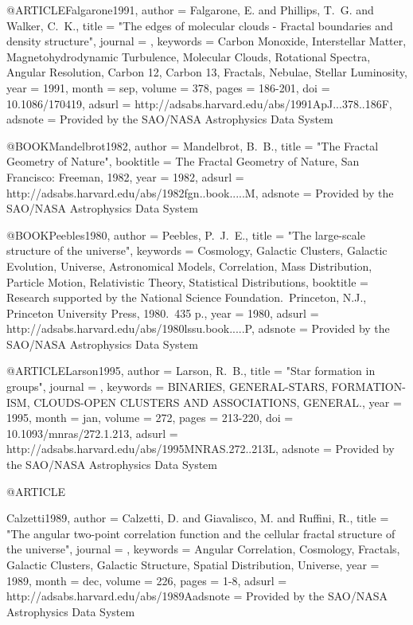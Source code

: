 \documentclass[useAMS,usenatbib]{mnras}
\begin{document}
{{{{{{{{{{{{{{{@ARTICLE{Falgarone1991,
   author = {{Falgarone}, E. and {Phillips}, T.~G. and {Walker}, C.~K.},
    title = "{The edges of molecular clouds - Fractal boundaries and density structure}",
  journal = {\apj},
 keywords = {Carbon Monoxide, Interstellar Matter, Magnetohydrodynamic Turbulence, Molecular Clouds, Rotational Spectra, Angular Resolution, Carbon 12, Carbon 13, Fractals, Nebulae, Stellar Luminosity},
     year = 1991,
    month = sep,
   volume = 378,
    pages = {186-201},
      doi = {10.1086/170419},
   adsurl = {http://adsabs.harvard.edu/abs/1991ApJ...378..186F},
  adsnote = {Provided by the SAO/NASA Astrophysics Data System}
}

@BOOK{Mandelbrot1982,
   author = {{Mandelbrot}, B.~B.},
    title = "{The Fractal Geometry of Nature}",
booktitle = {The Fractal Geometry of Nature, San Francisco: Freeman, 1982},
     year = 1982,
   adsurl = {http://adsabs.harvard.edu/abs/1982fgn..book.....M},
  adsnote = {Provided by the SAO/NASA Astrophysics Data System}
}

@BOOK{Peebles1980,
   author = {{Peebles}, P.~J.~E.},
    title = "{The large-scale structure of the universe}",
 keywords = {Cosmology, Galactic Clusters, Galactic Evolution, Universe, Astronomical Models, Correlation, Mass Distribution, Particle Motion, Relativistic Theory, Statistical Distributions},
booktitle = {Research supported by the National Science Foundation.~Princeton, N.J., Princeton University Press, 1980.~435 p.},
     year = 1980,
   adsurl = {http://adsabs.harvard.edu/abs/1980lssu.book.....P},
  adsnote = {Provided by the SAO/NASA Astrophysics Data System}
}

@ARTICLE{Larson1995,
   author = {{Larson}, R.~B.},
    title = "{Star formation in groups}",
  journal = {\mnras},
 keywords = {BINARIES, GENERAL-STARS, FORMATION-ISM, CLOUDS-OPEN CLUSTERS AND ASSOCIATIONS, GENERAL.},
     year = 1995,
    month = jan,
   volume = 272,
    pages = {213-220},
      doi = {10.1093/mnras/272.1.213},
   adsurl = {http://adsabs.harvard.edu/abs/1995MNRAS.272..213L},
  adsnote = {Provided by the SAO/NASA Astrophysics Data System}
}

@ARTICLE{Calzetti1989,
   author = {{Calzetti}, D. and {Giavalisco}, M. and {Ruffini}, R.},
    title = "{The angular two-point correlation function and the cellular fractal structure of the universe}",
  journal = {\aap},
 keywords = {Angular Correlation, Cosmology, Fractals, Galactic Clusters, Galactic Structure, Spatial Distribution, Universe},
     year = 1989,
    month = dec,
   volume = 226,
    pages = {1-8},
   adsurl = {http://adsabs.harvard.edu/abs/1989Aadsnote = {Provided by the SAO/NASA Astrophysics Data System}
}

}}}}}}}}}}}}}}}}
\end{document}
